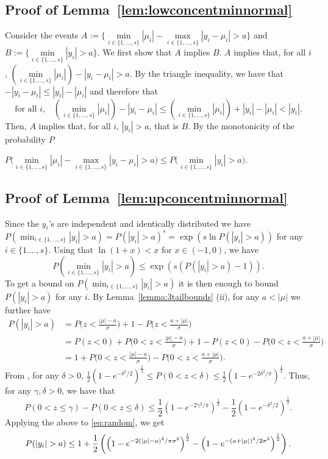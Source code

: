 \documentclass[
  12pt]{article}
\begin{document}
\subsection{Proof of Lemma~\ref{lem:lowconcentminnormal}}
Consider the events $A:=\{ \underset{i \in \{1,\ldots,s\}}{\min}|\mu_i|- \underset{i \in \{1,\ldots,s\}}{\max}|y_i-\mu_i| > a\}$ and $B:=\{\underset{i \in \{1,\ldots,s\}}{\min}|y_i| > a\}$. We first show that $A$ implies $B$. $A$ implies that, for all $i$, $(\underset{i \in \{1,\ldots,s\}}{\min}|\mu_i|) - |y_i-\mu_i| > a $.  By the triangle inequality, we have that $ -|y_i-\mu_i|\leq|y_i|-|\mu_i|$ and therefore that $$ \text{for all } i, \;\;\;(\min_{i \in \{1,\ldots,s\}}|\mu_i|) - |y_i-\mu_i| \leq  (\min_{i \in \{1,\ldots,s\}}|\mu_i|) +|y_i| - |\mu_i| < |y_i|.$$ 
Then, $A$ 
implies that, for all $i$, $|y_i| > a $, that is $B$. By the monotonicity of the probability $P$
\begin{center}$ P\Big(\underset{i \in \{1,\ldots,s\}}{\min}|\mu_i|-\underset{i \in \{1,\ldots,s\}}{\max}|y_i-\mu_i| > a\Big) \leq P\Big(\underset{i \in \{1,\ldots,s\}}{\min}|y_i| > a\Big) $. \end{center}

\subsection{Proof of Lemma~\ref{lem:upconcentminnormal}}
Since the $y_i$'s are independent and identically distributed we have $P(\min_{i\in\{1,\ldots,s\}}|y_i|>a)=P(|y_i|>a)^s= \exp\left(s\ln{P(|y_i|>a)}\right)$ for any $i\in\{1.\ldots,s\}$. Using that $\ln\left(1+ x \right)< x$ for $x\in(-1,0)$, we have
\begin{equation}\label{eq:grpoih}
    P(\min_{i\in\{1,\ldots,s\}}|y_i|>a)\leq \exp\left(s(P(|y_i|>a)-1)\right).
\end{equation}
To get a bound on $P(\min_{i\in\{1,\ldots,s\}}|y_i|>a)$ it is then enough to bound $P(|y_i|>a)$ for any $i$. By Lemma~\ref{lemma:3tailbounds} (ii), for any $a<|\mu|$ we further have
\begin{align}
    P(|y_i|>a) &= P\Big(z<\frac{|\mu|-a}{\sigma}\Big) + 1- P\Big(z<\frac{a+|\mu|}{\sigma}\Big) \nonumber \\
    &= P(z<0)
    +P\Big(0<z<\frac{|\mu|-a}{\sigma}\Big)+ 1 - P(z<0) - P\Big(0<z<\frac{a+|\mu|}{\sigma}\Big) \nonumber \\
    &= 1+P\Big(0<z<\frac{|\mu|-a}{\sigma}\Big)-P\Big(0<z<\frac{a+|\mu|}{\sigma}\Big)\label{eq:random}.
\end{align}
From \cite{chu}, for any $\delta>0$, $\frac{1}{2}\left(1-e^{-\delta^2/2}\right)^{\frac{1}{2}}\leq P(0 <z < \delta)\leq \frac{1}{2}\left(1-e^{-2\delta^2/\pi}\right)^{\frac{1}{2}}$. Thus, for any $\gamma,\delta>0$, we have that
$$ P(0<z \leq \gamma)-P(0<z \leq \delta)\leq
\frac{1}{2}\left(1-e^{-2\gamma^2/\pi}\right)^{\frac{1}{2}}-\frac{1}{2}\left(1-e^{-\delta^2/2}\right)^{\frac{1}{2}}.$$
Applying the above to \eqref{eq:random}, we get
$$P(|y_i|>a) \leq 
1+ \frac{1}{2}\left(\left(1-e^{-2(|\mu|-a)^2/\pi\sigma^2}\right)^{\frac{1}{2}}-\left(1-e^{-(a+|\mu|)^2/2\sigma^2}\right)^{\frac{1}{2}}\right).\\$$
\end{document}
